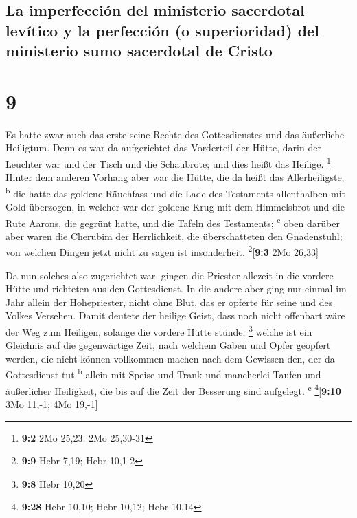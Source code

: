 \hypertarget{la-imperfecciuxf3n-del-ministerio-sacerdotal-levuxedtico-y-la-perfecciuxf3n-o-superioridad-del-ministerio-sumo-sacerdotal-de-cristo}{%
\subsection{La imperfección del ministerio sacerdotal levítico y la
perfección (o superioridad) del ministerio sumo sacerdotal de
Cristo}\label{la-imperfecciuxf3n-del-ministerio-sacerdotal-levuxedtico-y-la-perfecciuxf3n-o-superioridad-del-ministerio-sumo-sacerdotal-de-cristo}}

\hypertarget{section-8}{%
\section{9}\label{section-8}}

 Es hatte zwar auch das erste seine Rechte des
Gottesdienstes und das äußerliche Heiligtum.  Denn es war
da aufgerichtet das Vorderteil der Hütte, darin der Leuchter war und der
Tisch und die Schaubrote; und dies heißt das Heilige. \footnote{\textbf{9:2}
  2Mo 25,23; 2Mo 25,30-31}  Hinter dem anderen Vorhang
aber war die Hütte, die da heißt das Allerheiligste; \textsuperscript{b}
 die hatte das goldene Räuchfass und die Lade des
Testaments allenthalben mit Gold überzogen, in welcher war der goldene
Krug mit dem Himmelsbrot und die Rute Aarons, die gegrünt hatte, und die
Tafeln des Testaments; \textsuperscript{c}  oben darüber
aber waren die Cherubim der Herrlichkeit, die überschatteten den
Gnadenstuhl; von welchen Dingen jetzt nicht zu sagen ist insonderheit.
\footnote{\textbf{9:9} Hebr 7,19; Hebr 10,1-2}{[}\textbf{9:3} 2Mo
26,33{]}

 Da nun solches also zugerichtet war, gingen die Priester
allezeit in die vordere Hütte und richteten aus den Gottesdienst.
 In die andere aber ging nur einmal im Jahr allein der
Hohepriester, nicht ohne Blut, das er opferte für seine und des Volkes
Versehen.  Damit deutete der heilige Geist, dass noch
nicht offenbart wäre der Weg zum Heiligen, solange die vordere Hütte
stünde, \footnote{\textbf{9:8} Hebr 10,20}  welche ist ein
Gleichnis auf die gegenwärtige Zeit, nach welchem Gaben und Opfer
geopfert werden, die nicht können vollkommen machen nach dem Gewissen
den, der da Gottesdienst tut \textsuperscript{b}  allein
mit Speise und Trank und mancherlei Taufen und äußerlicher Heiligkeit,
die bis auf die Zeit der Besserung sind aufgelegt. \textsuperscript{c}
\footnote{\textbf{9:28} Hebr 10,10; Hebr 10,12; Hebr 10,14}{[}\textbf{9:10}
3Mo 11,-1; 4Mo 19,-1{]}

